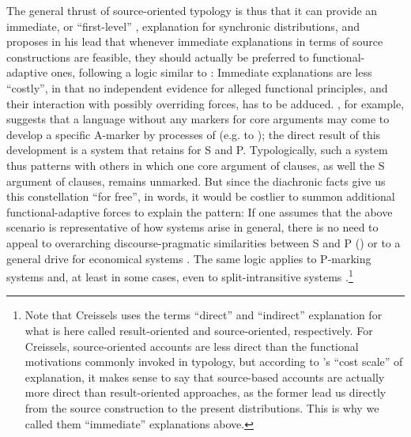 \documentclass[output=paper]{langsci/langscibook}
\begin{document}
The general thrust of source-oriented typology is thus that it can provide an immediate, or “first-level” \citep[1]{Creissels2008}, explanation for synchronic distributions, and  proposes in his lead  that whenever immediate explanations in terms of source constructions are feasible, they should actually be preferred to functional-adaptive ones, following a logic similar to : Immediate explanations are less “costly”, in that no independent evidence for alleged functional principles, and their interaction with possibly overriding forces, has to be adduced. \citet{Cristofaro2014}, for example, suggests that a language without any  markers for core arguments may come to develop a specific A-marker by processes of  (e.g.  to  ); the direct result of this development is a  system that retains  for S and P. Typologically, such a system thus patterns with others in which one core argument of  clauses, as well the S argument of  clauses, remains unmarked. But since the diachronic facts give us this constellation “for free”, in  words, it would be costlier to summon additional functional-adaptive forces to explain the pattern: If one assumes that the above scenario is representative of how   systems arise in general, there is no need to appeal to overarching discourse-pragmatic similarities between S and P (\citealt{DuBois1987}) or to a general drive for economical  systems \citep{Comrie1989}. The same logic applies to P-marking systems and, at least in some cases, even to split-intransitive systems \citep{Creissels2008}.\footnote{Note that Creissels uses the terms “direct” and “indirect” explanation for what is here called result-oriented and source-oriented, respectively. For Creissels, source-oriented accounts are less direct than the functional motivations commonly invoked in typology, but according to ’s “cost scale” of explanation, it makes sense to say that source-based accounts are actually more direct than result-oriented approaches, as the former lead us directly from the source construction to the present distributions. This is why we called them “immediate” explanations above.} 
\end{document}
